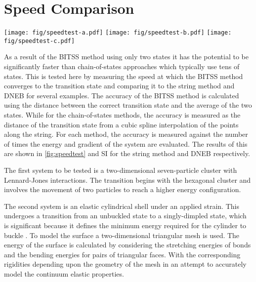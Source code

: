 \documentclass[aps,twocolumn]{revtex4}
\newcommand{\temp}[1]{{\leavevmode\color{red}#1}}
\begin{document}
\section{Speed Comparison}
\begin{figure*}[htb]
  \centering
  \texttt{[image: fig/speedtest-a.pdf]}%
  \texttt{[image: fig/speedtest-b.pdf]}%
  \texttt{[image: fig/speedtest-c.pdf]}%
  \caption{
    The rate of convergence to the transition state for (a) a Lennard-Jones seven-particle cluster, (b) cylindrical shell buckling, (c) wetting of a chemically-striped surface.
    Above are the two minimum energy states and the transition state between them.
    Below is shown the convergence to the transition state as a function of the number of gradient calculations using the BITSS (black line) and string methods.
    The string method is repeated with a differing number of images along the string, the number of which is listed in the legend in (c).
  }
  \label{fig:speedtest}
\end{figure*}

\topic As a result of the BITSS method using only two states it has the potential to be significantly faster than chain-of-states approaches which typically use tens of states.
This is tested here by measuring the speed at which the BITSS method converges to the transition state and comparing it to the string method and DNEB for several examples.
The accuracy of the BITSS method is calculated using the distance between the correct transition state and the average of the two states.
While for the chain-of-states methods, the accuracy is measured as the distance of the transition state from a cubic spline interpolation of the points along the string.
For each method, the accuracy is measured against the number of times the energy and gradient of the system are evaluated.
The results of this are shown in \cref{fig:speedtest} and \temp{SI} for the string method and DNEB respectively.

\topic The first system to be tested is a two-dimensional seven-particle cluster with Lennard-Jones interactions.
The transition begins with the hexagonal cluster and involves the movement of two particles to reach a higher energy configuration.

\topic The second system is an elastic cylindrical shell under an applied strain.
This undergoes a transition from an unbuckled state to a singly-dimpled state, which is significant because it defines the minimum energy required for the cylinder to buckle \cite{Panter2019}.
To model the surface a two-dimensional triangular mesh is used.
The energy of the surface is calculated by considering the stretching energies of bonds and the bending energies for pairs of triangular faces.
With the corresponding rigidities depending upon the geometry of the mesh in an attempt to accurately model the continuum elastic properties.
\end{document}
